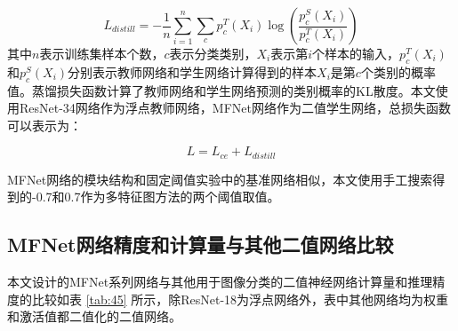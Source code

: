\begin{equation}
  \label{eq:distill}
  L_{distill} = -\frac{1}{n} \sum_{i = 1}^{n} \sum_{c} p_c^T(X_i)\log(\frac{p_c^S(X_i)}{p_c^T(X_i)})
\end{equation}
其中$n$表示训练集样本个数，$c$表示分类类别，$X_i$表示第$i$个样本的输入，$p_c^T(X_i)$和$p_c^S(X_i)$分别表示教师网络和学生网络计算得到的样本$X_i$是第$c$个类别的概率值。蒸馏损失函数计算了教师网络和学生网络预测的类别概率的KL散度。本文使用ResNet-34网络作为浮点教师网络，MFNet网络作为二值学生网络，总损失函数可以表示为：

\begin{equation}
  L = L_{ce} + L_{distill}
\end{equation}

MFNet网络的模块结构和固定阈值实验中的基准网络相似，本文使用手工搜索得到的-0.7和0.7作为多特征图方法的两个阈值取值。

\subsection{MFNet网络精度和计算量与其他二值网络比较}

本文设计的MFNet系列网络与其他用于图像分类的二值神经网络计算量和推理精度的比较如表 \ref{tab:45} 所示，除ResNet-18为浮点网络外，表中其他网络均为权重和激活值都二值化的二值网络。

